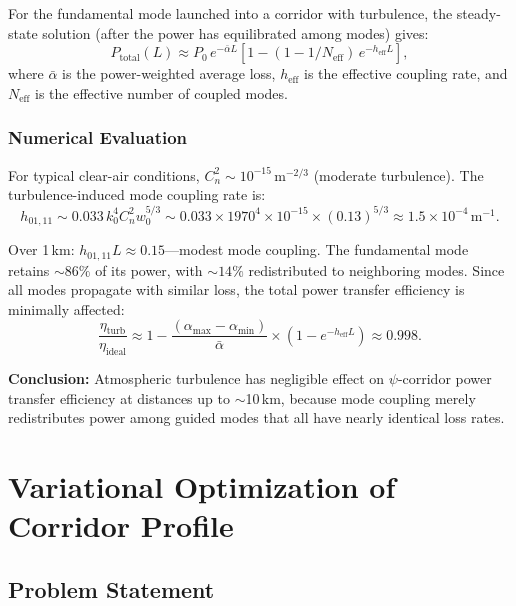\documentclass[journal,twocolumn]{IEEEtran}
\begin{document}
For the fundamental mode launched into a corridor with turbulence, the
steady-state solution (after the power has equilibrated among modes) gives:
\begin{equation}
P_\text{total}(L) \approx P_0\,e^{-\bar{\alpha}L}
\left[1 - (1 - 1/N_\text{eff})\,e^{-h_\text{eff}L}\right],
\end{equation}
where $\bar{\alpha}$ is the power-weighted average loss,
$h_\text{eff}$ is the effective coupling rate, and $N_\text{eff}$
is the effective number of coupled modes.

\subsubsection{Numerical Evaluation}

For typical clear-air conditions, $C_n^2 \sim 10^{-15}\,\text{m}^{-2/3}$
(moderate turbulence). The turbulence-induced mode coupling rate is:
\begin{equation}
h_{01,11} \sim 0.033\,k_0^4 C_n^2 w_0^{5/3}
\sim 0.033 \times 1970^4 \times 10^{-15} \times (0.13)^{5/3}
\approx 1.5\times10^{-4}\,\text{m}^{-1}.
\end{equation}

Over 1\,km: $h_{01,11}L \approx 0.15$---modest mode coupling.
The fundamental mode retains $\sim 86\%$ of its power, with $\sim 14\%$
redistributed to neighboring modes. Since all modes propagate with
similar loss, the total power transfer efficiency is minimally affected:
\begin{equation}
\frac{\eta_\text{turb}}{\eta_\text{ideal}}
\approx 1 - \frac{(\alpha_\text{max} - \alpha_\text{min})}{\bar{\alpha}}
\times (1 - e^{-h_\text{eff}L})
\approx 0.998.
\end{equation}

\textbf{Conclusion:} Atmospheric turbulence has negligible effect on
$\psi$-corridor power transfer efficiency at distances up to $\sim$10\,km,
because mode coupling merely redistributes power among guided modes that
all have nearly identical loss rates.

\section{Variational Optimization of Corridor Profile}\label{sec:variational}

\subsection{Problem Statement}
\end{document}
